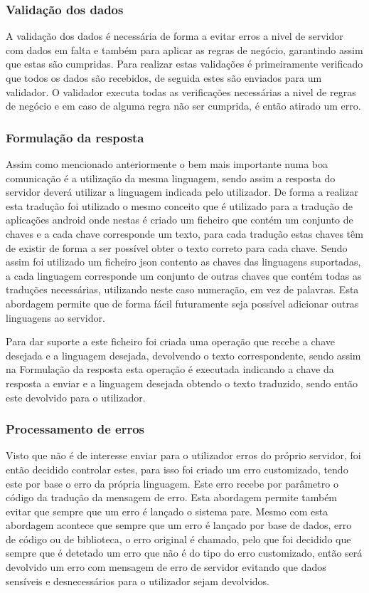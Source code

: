 \subsubsection{Validação dos dados}
A validação dos dados é necessária de forma a evitar erros a nivel de servidor com dados em falta e também para aplicar as regras de negócio, garantindo assim que estas são cumpridas. Para realizar estas validações é primeiramente verificado que todos os dados são recebidos, de seguida estes são enviados para um validador. O validador executa todas as verificações necessárias a nivel de regras de negócio e em caso de alguma regra não ser cumprida, é então atirado um erro.

\subsubsection{Formulação da resposta}
Assim como mencionado anteriormente o bem mais importante numa boa comunicação é a utilização da mesma linguagem, sendo assim a resposta do servidor deverá  utilizar a linguagem indicada pelo utilizador. De forma a realizar esta tradução foi utilizado o mesmo conceito que é utilizado para a tradução de aplicações android onde nestas é criado um ficheiro que contém um conjunto de chaves e a cada chave corresponde um texto, para cada tradução estas chaves têm de existir de forma a ser possível obter o texto correto para cada chave. Sendo assim foi utilizado um ficheiro json contento as chaves das linguagens suportadas, a cada linguagem corresponde um conjunto de outras chaves que contém todas as traduções necessárias, utilizando neste caso numeração, em vez de palavras. Esta abordagem permite que de forma fácil futuramente seja possível adicionar outras linguagens ao servidor.


Para dar suporte a este ficheiro foi criada uma operação que recebe a chave desejada e a linguagem desejada, devolvendo o texto correspondente, sendo assim na Formulação da resposta esta operação é executada indicando a chave da resposta a enviar e a linguagem desejada obtendo o texto traduzido, sendo então este devolvido para o utilizador.

\newpage

\subsubsection{Processamento de erros}
Visto que não é de interesse enviar para o utilizador erros do próprio servidor, foi então decidido controlar estes, para isso foi criado um erro customizado, tendo este por base o erro da própria linguagem. Este erro recebe por parâmetro o código da tradução da mensagem de erro. Esta abordagem permite também evitar que sempre que um erro é lançado o sistema pare. Mesmo com esta abordagem acontece que sempre que um erro é lançado por base de dados, erro de código ou de biblioteca, o erro original é chamado, pelo que foi decidido que sempre que é detetado um erro que não é do tipo do erro customizado, então será devolvido um erro com mensagem de erro de servidor evitando que dados sensíveis e desnecessários para o utilizador sejam devolvidos.